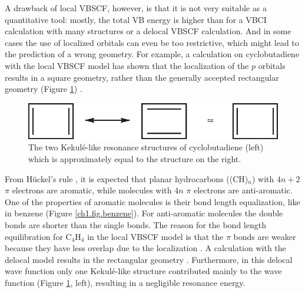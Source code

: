 A drawback of local VBSCF, however, is that it is not very suitable as a quantitative tool: mostly, the total VB energy is higher than for a VBCI calculation with many structures or a delocal VBSCF calculation. And in some cases the use of localized orbitals can even be too restrictive, which might lead to the prediction of a wrong geometry. For example, a calculation on cyclobutadiene with the local VBSCF model \cite{cyclobutt} has shown that the localization of the $p$ orbitals results in a square geometry, rather than the generally accepted rectangular geometry (Figure \ref{ch1.fig.butadiene}) \cite{arnold}. 
\begin{figure}[htdp]
\center
\includegraphics{introduction/figures/butadiene.eps}
\caption{The two Kekul\'e-like resonance structures of cyclobutadiene (left) which is approximately equal to the structure on the right.}
\label{ch1.fig.butadiene}
\end{figure}
From H\"{u}ckel's rule \cite{huckel2,huckel4}, it is expected that planar hydrocarbons ((CH)$_n$) with $4n+2$ $\pi$ electrons are aromatic, while molecules with $4n$ $\pi$ electrons are anti-aromatic. One of the properties of aromatic molecules is their bond length equalization, like in benzene (Figure \ref{ch1.fig.benzene}). For anti-aromatic molecules the double bonds are shorter than the single bonds. The reason for the bond length equilibration for C$_4$H$_4$ in the local VBSCF model is that the $\pi$ bonds are weaker because they have less overlap due to the localization \cite{cyclobutt}. A calculation with the delocal model results in the rectangular geometry \cite{cyclobutt}. Furthermore, in this delocal wave function only one Kekul\'{e}-like structure contributed mainly to the wave function (Figure \ref{ch1.fig.butadiene}, left), resulting in a negligible resonance energy.

